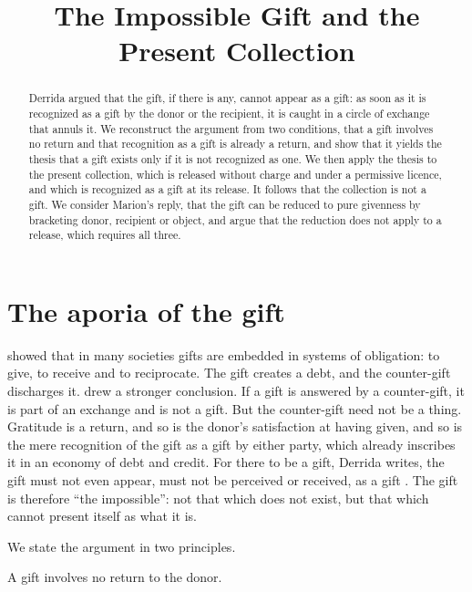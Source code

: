 \documentclass{situationist-preprint}
\title{The Impossible Gift and the Present Collection}
\begin{document}
\maketitle

\begin{abstract}
Derrida argued that the gift, if there is any, cannot appear as a gift: as soon as it is recognized as a gift by the donor or the recipient, it is caught in a circle of exchange that annuls it. We reconstruct the argument from two conditions, that a gift involves no return and that recognition as a gift is already a return, and show that it yields the thesis that a gift exists only if it is not recognized as one. We then apply the thesis to the present collection, which is released without charge and under a permissive licence, and which is recognized as a gift at its release. It follows that the collection is not a gift. We consider Marion's reply, that the gift can be reduced to pure givenness by bracketing donor, recipient or object, and argue that the reduction does not apply to a release, which requires all three.
\end{abstract}

\section{The aporia of the gift}

\citet{Mauss1925} showed that in many societies gifts are embedded in systems of obligation: to give, to receive and to reciprocate. The gift creates a debt, and the counter-gift discharges it. \citet{Derrida1991} drew a stronger conclusion. If a gift is answered by a counter-gift, it is part of an exchange and is not a gift. But the counter-gift need not be a thing. Gratitude is a return, and so is the donor's satisfaction at having given, and so is the mere recognition of the gift as a gift by either party, which already inscribes it in an economy of debt and credit. For there to be a gift, Derrida writes, the gift must not even appear, must not be perceived or received, as a gift \citep[ch.~1]{Derrida1991}. The gift is therefore \enquote{the impossible}: not that which does not exist, but that which cannot present itself as what it is.

We state the argument in two principles.

\begin{principle}\label{p:noreturn}
A gift involves no return to the donor.
\end{principle}
\end{document}
